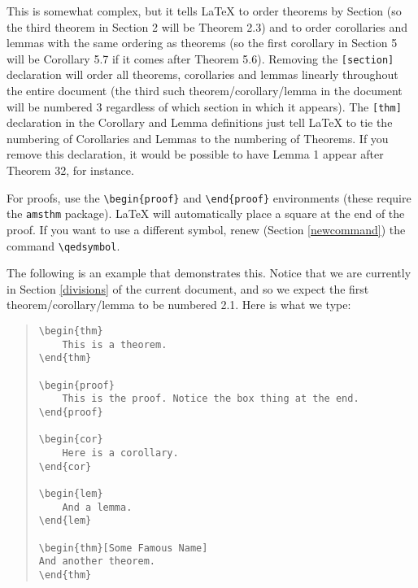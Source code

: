 \documentclass[letterpaper,twoside,10pt]{article}
\newtheorem{thm}{Theorem}[section]
\newtheorem{cor}[thm]{Corollary}
\newtheorem{lem}[thm]{Lemma}
\begin{document}
This is somewhat complex, but it tells {\LaTeX} to order theorems by Section (so the third theorem
in Section 2 will be Theorem 2.3) and to order corollaries and lemmas with the same ordering as
theorems (so the first corollary in Section 5 will be Corollary 5.7 if it comes after Theorem 5.6).
Removing the \texttt{[section]} declaration will order all theorems, corollaries and lemmas linearly
throughout the entire document (the third such theorem/corollary/lemma in the document will be
numbered 3 regardless of which section in which it appears). The \texttt{[thm]} declaration in the
Corollary and Lemma definitions just tell {\LaTeX} to tie the numbering of Corollaries and Lemmas to
the numbering of Theorems. If you remove this declaration, it would be possible to have Lemma 1
appear after Theorem 32, for instance.

\bigbreak For proofs, use the \verb!\begin{proof}! and \verb!\end{proof}! environments (these
require the \texttt{amsthm} package). {\LaTeX} will automatically place a square at the end of the
proof. If you want to use a different symbol, renew (Section \ref{newcommand}) the command
\verb!\qedsymbol!.

\newpage
The following is an example that demonstrates this. Notice that we are currently in Section
\ref{divisions} of the current document, and so we expect the first theorem/corollary/lemma to be
numbered 2.1. Here is what we type:

\begin{quote}
\begin{verbatim}
\begin{thm}
    This is a theorem.
\end{thm}

\begin{proof}
    This is the proof. Notice the box thing at the end.
\end{proof}

\begin{cor}
    Here is a corollary.
\end{cor}

\begin{lem}
    And a lemma.
\end{lem}

\begin{thm}[Some Famous Name]
And another theorem.
\end{thm}
\end{verbatim}
\end{quote}
\end{document}
